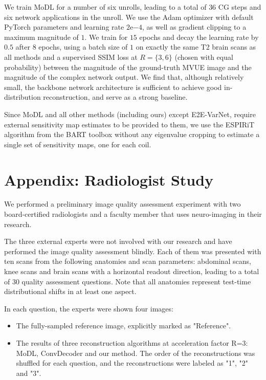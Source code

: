 \documentclass{article}
\begin{document}
We train MoDL for a number of six unrolls, leading to a total of $36$ CG steps and six network applications in the unroll. We use the Adam optimizer with default PyTorch parameters and learning rate $2\mathrm{e}{-4}$, as well as gradient clipping to a maximum magnitude of $1$. We train for $15$ epochs and decay the learning rate by $0.5$ after $8$ epochs, using a batch size of $1$ on exactly the same T2 brain scans as all methods and a supervised SSIM loss at $R=\{3,6\}$ (chosen with equal probability) between the magnitude of the ground-truth MVUE image and the magnitude of the complex network output. We find that, although relatively small, the backbone network architecture is sufficient to achieve good in-distribution reconstruction, and serve as a strong baseline.

Since MoDL and all other methods (including ours) except E2E-VarNet, require external sensitivity map estimates to be provided to them, we use the ESPIRiT algorithm from the BART toolbox \cite{bart} without any eigenvalue cropping to estimate a single set of sensitivity maps, one for each coil.

\section{Appendix: Radiologist Study}\label{app:radiologist}
We performed a preliminary image quality assessment experiment with two board-certified radiologists and a faculty member that uses neuro-imaging in their research.

The three external experts were not involved with our research and have performed the image quality assessment blindly. Each of them was presented with ten scans from the following anatomies and scan parameters: abdominal scans, knee scans and brain scans with a horizontal readout direction, leading to a total of 30 quality assessment questions. Note that all anatomies represent test-time distributional shifts in at least one aspect.

In each question, the experts were shown four images:
\begin{itemize}
    \item The fully-sampled reference image, explicitly marked as "Reference".
    \item The results of three reconstruction algorithms at acceleration factor R=3: MoDL, ConvDecoder and our method. The order of the reconstructions was shuffled for each question, and the reconstructions were labeled as "1", "2" and "3".
\end{itemize}
\end{document}
